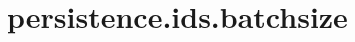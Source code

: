 \section{persistence.ids.batchsize}
\label{configuration:PersistenceIdsBatchsize}
\AvailableInJavaOnly{\TODO}